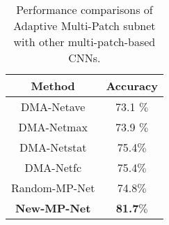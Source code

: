 \documentclass[10pt,twocolumn,letterpaper]{article}
\begin{document}
	\begin{table}
		\begin{center}	
			\begin{tabular}{||c|c||} 
				\hline
				Method & Accuracy \\
				\hline\hline
				DMA-Net{\tiny ave} & 73.1 $\%$ \\
				DMA-Net{\tiny max} & 73.9 $\%$ \\
				DMA-Net{\tiny stat} & 75.4$\% $ \\
				DMA-Net{\tiny fc} & 75.4$\% $ \\
				\hline
				Random-MP-Net & 74.8$\%$ \\
				\textbf{New-MP-Net} & \textbf{81.7$\% $}\\
				\hline
			\end{tabular} 
		\end{center} 
		\caption{Performance comparisons of Adaptive Multi-Patch subnet with other multi-patch-based CNNs.}
		\label{tabel1} 
		\vspace{-3mm}
	\end{table}
	
\end{document}
